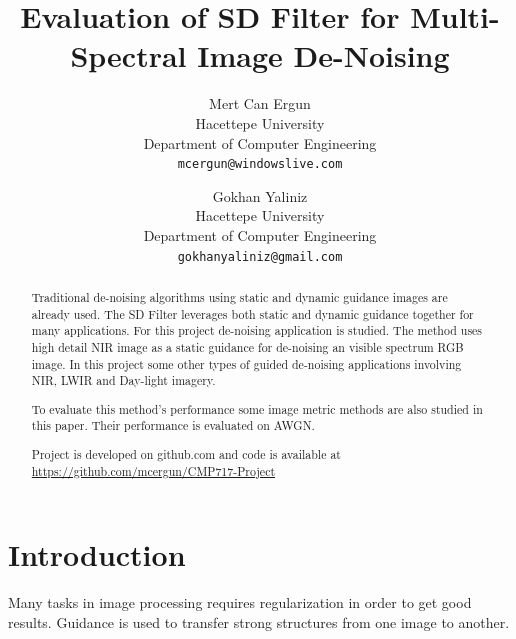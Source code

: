 \documentclass[10pt,twocolumn,letterpaper]{article}
\begin{document}
\title{Evaluation of SD Filter for Multi-Spectral Image De-Noising}

\author{Mert Can Ergun\\
Hacettepe University\\
Department of Computer Engineering\\
{\tt\small mcergun@windowslive.com}
\and
Gokhan Yaliniz\\
Hacettepe University\\
Department of Computer Engineering\\
{\tt\small gokhanyaliniz@gmail.com}
}

\maketitle

\begin{abstract}
   Traditional de-noising algorithms using static and dynamic guidance images are already used. The SD Filter leverages both static and dynamic guidance together for many applications. For this project de-noising application is studied. The method uses high detail NIR image as a static guidance for de-noising an visible spectrum RGB image. In this project some other types of guided de-noising applications involving NIR, LWIR and Day-light imagery.
   
   To evaluate this method's performance some image metric methods are also studied in this paper. Their performance is evaluated on AWGN.
   
   Project is developed on github.com and code is available at \href{https://github.com/mcergun/CMP717-Project}{https://github.com/mcergun/CMP717-Project}
\end{abstract}

\section{Introduction}

Many tasks in image processing requires regularization in order to get good results. Guidance is used to transfer strong structures from one image to another. 
\end{document}
